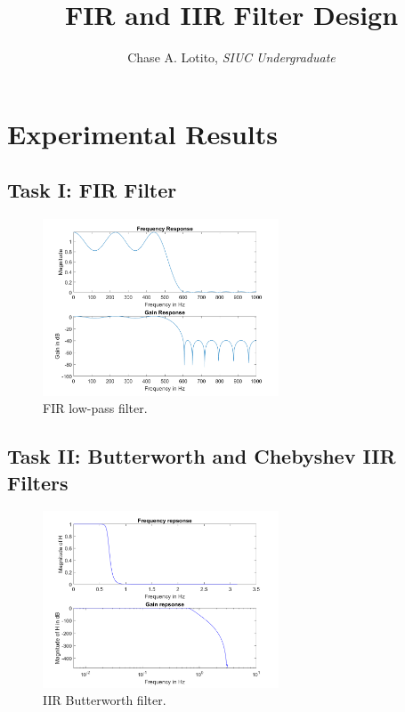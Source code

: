 \documentclass{IEEEtran}
\title{\vspace{-3cm} FIR and IIR Filter Design}
\author{Chase A. Lotito, \textit{SIUC Undergraduate}}
\date{}
\begin{document}
\pagestyle{fancy}

\fancyhead{}

\maketitle %

\section{Experimental Results}

\subsection{Task I: FIR Filter}

\begin{figure}[!ht] 
    \centering
    \includegraphics[width = 7cm]{task1.png}
    \caption{FIR low-pass filter.}
    \label{fig:task1}
\end{figure}

\subsection{Task II: Butterworth and Chebyshev IIR Filters}

\begin{figure}[!ht] 
    \centering
    \includegraphics[width = 7cm]{butterworth.png}
    \caption{IIR Butterworth filter.}
    \label{fig:butterworth}
\end{figure}
\end{document}
